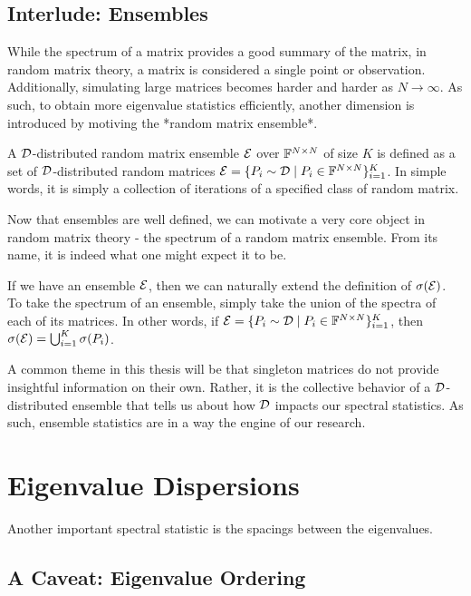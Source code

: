 \subsection{Interlude: Ensembles}

While the spectrum of a matrix provides a good summary of the matrix, in random matrix theory, a matrix is considered a single point or observation. Additionally, simulating large matrices becomes harder and harder as $N \to \infty$. As such, to obtain more eigenvalue statistics efficiently, another dimension is introduced by motiving the *random matrix ensemble*.

\begin{definition}
A $\mathcal{D}$-distributed random matrix ensemble $\mathcal{E}$ over $\mathbb{F}^{N \times N}$ of size $K$ is defined as a set of $\mathcal{D}$-distributed random matrices $\mathcal{E} = \{P_i \sim \mathcal{D} \mid P_i \in \mathbb{F}^{N \times N}\}_{i = 1}^K$. In simple words, it is simply a collection of iterations of a specified class of random matrix.
\end{definition}

Now that ensembles are well defined, we can motivate a very core object in random matrix theory - the spectrum of a random matrix ensemble. From its name, it is indeed what one might expect it to be.

\begin{definition}
If we have an ensemble $\mathcal{E}$, then we can naturally extend the definition of $\sigma(\mathcal{E})$. To take the spectrum of an ensemble, simply take the union of the spectra of each of its matrices. In other words, if $\mathcal{E} = \{P_i \sim \mathcal{D} \mid P_i \in \mathbb{F}^{N \times N}\}_{i = 1}^K$, then $\sigma(\mathcal{E}) = \bigcup_{i=1}^K \sigma(P_i)$.
\end{definition}

A common theme in this thesis will be that singleton matrices do not provide insightful information on their own. Rather, it is the collective behavior of a $\mathcal{D}$-distributed ensemble that tells us about how $\mathcal{D}$ impacts our spectral statistics. As such, ensemble statistics are in a way the engine of our research.

\section{Eigenvalue Dispersions}

Another important spectral statistic is the spacings between the eigenvalues.

\subsection{A Caveat: Eigenvalue Ordering}

